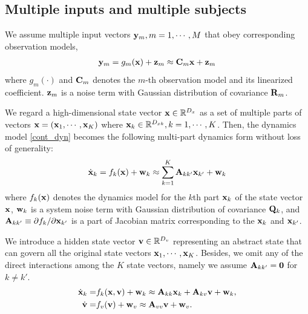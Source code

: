 \documentclass{article}
\begin{document}
\subsection{Multiple inputs and multiple subjects}
We assume multiple input vectors ${\bf y}_m, m=1,\cdots, M$ 
that obey corresponding observation models,
\begin{align}
 {\bf y}_{m} = g_m( {\bf x} ) + {\bf z}_{m} \approx {\bf C}_m {\bf x} + {\bf z}_m
\end{align}
where $g_m(\cdot)$ and ${\bf C}_m$ denotes the $m$-th observation model and its linearized coefficient.
${\bf z}_m$ is a noise term with Gaussian distribution of covariance ${\bf R}_m$.

We regard a high-dimensional state vector ${\bf x}\in\mathbb{R}^{D_x}$ as a set of multiple parts of vectors
${\bf x}=({\bf x}_1,\cdots,{\bf x}_K)$ where ${\bf x}_k\in\mathbb{R}^{D_{xk}}, k=1,\cdots, K$.
Then, the dynamics model \eqref{cont_dyn} becomes the following
 multi-part dynamics form without loss of generality:
\begin{align}
 \dot{{\bf x}}_{k} = f_k( {\bf x} ) + {\bf w}_k \approx \sum_{k=1}^K {\bf A}_{kk'} {\bf x}_{k'} + {\bf w}_k
\end{align}
where $f_k({\bf x})$ denotes the dynamics model for the $k$th part ${\bf x}_k$ of the state vector ${\bf x}$,
 ${\bf w}_k$ is a system noise term with Gaussian distribution of covariance ${\bf Q}_k$,
 and ${\bf A}_{kk'} \equiv \partial f_k / \partial {\bf x}_{k'}$ is a part of Jacobian matrix corresponding to the ${\bf x}_k$ and ${\bf x}_{k'}$.

We introduce a hidden state vector ${\bf v}\in\mathbb{R}^{D_v}$ representing an abstract state that can govern
all the original state vectors ${\bf x}_1,\cdots,{\bf x}_K$. Besides, we omit any of the direct interactions among the $K$ state vectors, namely we assume ${\bf A}_{kk'}={\bf 0}$ for $k\neq k'$.
\begin{align}
 \dot{{\bf x}}_{k} =& f_k( {\bf x}, {\bf v} ) + {\bf w}_k \approx  {\bf A}_{kk} {\bf x}_{k} + {\bf A}_{kv} {\bf v} + {\bf w}_k,\\
 \dot{{\bf v}} =& f_v( {\bf v} ) + {\bf w}_v \approx  {\bf A}_{vv} {\bf v} + {\bf w}_v.
\end{align}
\end{document}
